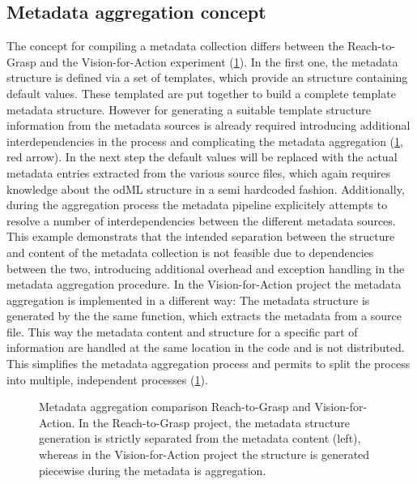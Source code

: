 \subsection{Metadata aggregation concept}
\label{sec:disscussion_metadata_concept}
The concept for compiling a metadata collection differs between the Reach-to-Grasp and the Vision-for-Action experiment (\cref{fig:discussion_comparison_r2g_v4a}). In the first one, the metadata structure is defined via a set of templates, which provide an  structure containing default values. These templated are put together to build a complete template metadata structure. However for generating a suitable template structure information from the metadata sources is already required introducing additional interdependencies in the process and complicating the metadata aggregation (\cref{fig:discussion_comparison_r2g_v4a}, red arrow). In the next step the default values will be replaced with the actual metadata entries extracted from the various source files, which again requires knowledge about the odML structure in a semi hardcoded fashion. Additionally, during the aggregation process the metadata pipeline explicitely attempts to resolve a number of interdependencies between the different metadata sources. This example demonstrats that the intended separation between the structure and content of the metadata collection is not feasible due to dependencies between the two, introducing additional overhead and exception handling in the metadata aggregation procedure.
In the Vision-for-Action project the metadata aggregation is implemented in a different way: The metadata structure is generated by the the same function, which extracts the metadata from a source file. This way the metadata content and structure for a specific part of information are handled at the same location in the code and is not distributed. This simplifies the metadata aggregation process and permits to split the process into multiple, independent processes (\cref{fig:discussion_comparison_r2g_v4a}).

\begin{figure}
 \centering
 
 \caption[Metadata aggregation comparison Reach-to-Grasp and Vision-for-Action]{Metadata aggregation comparison Reach-to-Grasp and Vision-for-Action. In the Reach-to-Grasp project, the metadata structure generation is strictly separated from the metadata content (left), whereas in the Vision-for-Action project the structure is generated  piecewise during the metadata is aggregation.}
 \label{fig:discussion_comparison_r2g_v4a}
\end{figure}

